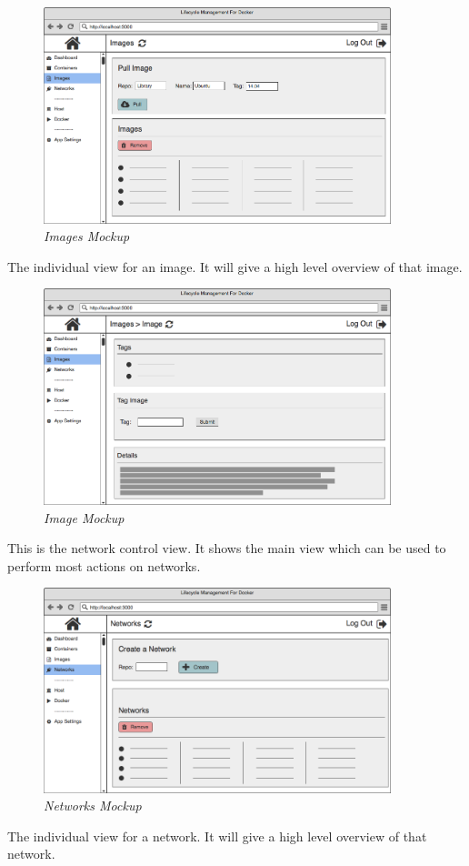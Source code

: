 \begin{figure}[!ht]
\centering
\includegraphics*[width=0.9\textwidth]{wireframes/images}
\caption{\em Images Mockup}
\end{figure}
The individual view for an image. It will give a high level overview of that image.

\begin{figure}[!ht]
\centering
\includegraphics*[width=0.9\textwidth]{wireframes/image}
\caption{\em Image Mockup}
\end{figure}
\clearpage
This is the network control view. It shows the main view which can be used to perform most actions on networks.

\begin{figure}[!ht]
\centering
\includegraphics*[width=0.9\textwidth]{wireframes/networks}
\caption{\em Networks Mockup}
\end{figure}
The individual view for a network. It will give a high level overview of that network.

